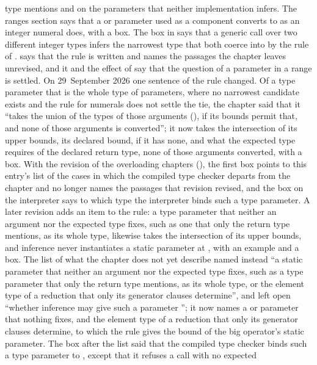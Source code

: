 \begin{description}
type mentions and on the  parameters that neither implementation
infers.
The ranges section says that a  or  parameter used as a
component converts to  as an integer numeral does, with a
box.
The box in  says that a generic call over two different
integer types infers the narrowest type that both coerce into by the rule of
.
 says that the rule is written and names the passages
the chapter leaves unrevised, and it and the effect of 
say that the question of a  parameter in a range is settled.
On 29~September 2026 one sentence of the rule changed.
Of a type parameter that is the whole type of parameters, where no narrowest
candidate exists and the rule for numerals does not settle the tie, the
chapter said that it ``takes the union of the types of those arguments
(), if its bounds permit that, and none of those
arguments is converted''; it now takes the intersection of its upper bounds,
its declared bound,  if it has none, and what the expected type
requires of the declared return type, none of those arguments converted, with
a box.
With the revision of the overloading chapters (),
the first box points to this entry's list of the cases in which the compiled
type checker departs from the chapter and no longer names the passages that revision revised, and the box
on the interpreter says to which type the interpreter binds such a type
parameter.
A later revision adds an item to the rule: a type parameter that neither an
argument nor the expected type fixes, such as one that only the return type
mentions, as its whole type, likewise takes the intersection of its upper
bounds, and inference never instantiates a static parameter at
, with an example and a box.
The list of what the chapter does not yet describe named instead ``a static
parameter that neither an argument nor the expected type fixes, such as a type
parameter that only the return type mentions, as its whole type, or the element
type of a reduction that only its generator clauses determine'', and left open
``whether inference may give such a parameter ''; it now names
a  or  parameter that nothing fixes, and the element type of
a reduction that only its generator clauses determine, to which the rule gives
the bound of the big operator's static parameter.
The box after the list said that the compiled type checker binds such a type
parameter to , except that it refuses a call with no expected

\end{description}
